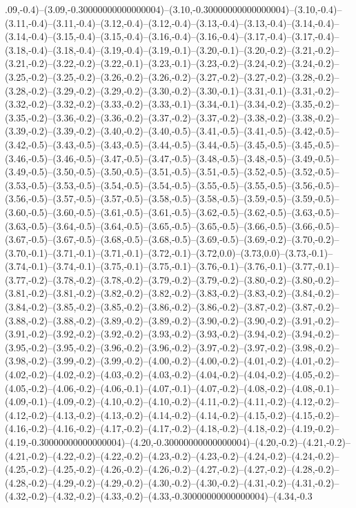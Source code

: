 .09,-0.4)--(3.09,-0.30000000000000004)--(3.10,-0.30000000000000004)--(3.10,-0.4)--(3.11,-0.4)--(3.11,-0.4)--(3.12,-0.4)--(3.12,-0.4)--(3.13,-0.4)--(3.13,-0.4)--(3.14,-0.4)--(3.14,-0.4)--(3.15,-0.4)--(3.15,-0.4)--(3.16,-0.4)--(3.16,-0.4)--(3.17,-0.4)--(3.17,-0.4)--(3.18,-0.4)--(3.18,-0.4)--(3.19,-0.4)--(3.19,-0.1)--(3.20,-0.1)--(3.20,-0.2)--(3.21,-0.2)--(3.21,-0.2)--(3.22,-0.2)--(3.22,-0.1)--(3.23,-0.1)--(3.23,-0.2)--(3.24,-0.2)--(3.24,-0.2)--(3.25,-0.2)--(3.25,-0.2)--(3.26,-0.2)--(3.26,-0.2)--(3.27,-0.2)--(3.27,-0.2)--(3.28,-0.2)--(3.28,-0.2)--(3.29,-0.2)--(3.29,-0.2)--(3.30,-0.2)--(3.30,-0.1)--(3.31,-0.1)--(3.31,-0.2)--(3.32,-0.2)--(3.32,-0.2)--(3.33,-0.2)--(3.33,-0.1)--(3.34,-0.1)--(3.34,-0.2)--(3.35,-0.2)--(3.35,-0.2)--(3.36,-0.2)--(3.36,-0.2)--(3.37,-0.2)--(3.37,-0.2)--(3.38,-0.2)--(3.38,-0.2)--(3.39,-0.2)--(3.39,-0.2)--(3.40,-0.2)--(3.40,-0.5)--(3.41,-0.5)--(3.41,-0.5)--(3.42,-0.5)--(3.42,-0.5)--(3.43,-0.5)--(3.43,-0.5)--(3.44,-0.5)--(3.44,-0.5)--(3.45,-0.5)--(3.45,-0.5)--(3.46,-0.5)--(3.46,-0.5)--(3.47,-0.5)--(3.47,-0.5)--(3.48,-0.5)--(3.48,-0.5)--(3.49,-0.5)--(3.49,-0.5)--(3.50,-0.5)--(3.50,-0.5)--(3.51,-0.5)--(3.51,-0.5)--(3.52,-0.5)--(3.52,-0.5)--(3.53,-0.5)--(3.53,-0.5)--(3.54,-0.5)--(3.54,-0.5)--(3.55,-0.5)--(3.55,-0.5)--(3.56,-0.5)--(3.56,-0.5)--(3.57,-0.5)--(3.57,-0.5)--(3.58,-0.5)--(3.58,-0.5)--(3.59,-0.5)--(3.59,-0.5)--(3.60,-0.5)--(3.60,-0.5)--(3.61,-0.5)--(3.61,-0.5)--(3.62,-0.5)--(3.62,-0.5)--(3.63,-0.5)--(3.63,-0.5)--(3.64,-0.5)--(3.64,-0.5)--(3.65,-0.5)--(3.65,-0.5)--(3.66,-0.5)--(3.66,-0.5)--(3.67,-0.5)--(3.67,-0.5)--(3.68,-0.5)--(3.68,-0.5)--(3.69,-0.5)--(3.69,-0.2)--(3.70,-0.2)--(3.70,-0.1)--(3.71,-0.1)--(3.71,-0.1)--(3.72,-0.1)--(3.72,0.0)--(3.73,0.0)--(3.73,-0.1)--(3.74,-0.1)--(3.74,-0.1)--(3.75,-0.1)--(3.75,-0.1)--(3.76,-0.1)--(3.76,-0.1)--(3.77,-0.1)--(3.77,-0.2)--(3.78,-0.2)--(3.78,-0.2)--(3.79,-0.2)--(3.79,-0.2)--(3.80,-0.2)--(3.80,-0.2)--(3.81,-0.2)--(3.81,-0.2)--(3.82,-0.2)--(3.82,-0.2)--(3.83,-0.2)--(3.83,-0.2)--(3.84,-0.2)--(3.84,-0.2)--(3.85,-0.2)--(3.85,-0.2)--(3.86,-0.2)--(3.86,-0.2)--(3.87,-0.2)--(3.87,-0.2)--(3.88,-0.2)--(3.88,-0.2)--(3.89,-0.2)--(3.89,-0.2)--(3.90,-0.2)--(3.90,-0.2)--(3.91,-0.2)--(3.91,-0.2)--(3.92,-0.2)--(3.92,-0.2)--(3.93,-0.2)--(3.93,-0.2)--(3.94,-0.2)--(3.94,-0.2)--(3.95,-0.2)--(3.95,-0.2)--(3.96,-0.2)--(3.96,-0.2)--(3.97,-0.2)--(3.97,-0.2)--(3.98,-0.2)--(3.98,-0.2)--(3.99,-0.2)--(3.99,-0.2)--(4.00,-0.2)--(4.00,-0.2)--(4.01,-0.2)--(4.01,-0.2)--(4.02,-0.2)--(4.02,-0.2)--(4.03,-0.2)--(4.03,-0.2)--(4.04,-0.2)--(4.04,-0.2)--(4.05,-0.2)--(4.05,-0.2)--(4.06,-0.2)--(4.06,-0.1)--(4.07,-0.1)--(4.07,-0.2)--(4.08,-0.2)--(4.08,-0.1)--(4.09,-0.1)--(4.09,-0.2)--(4.10,-0.2)--(4.10,-0.2)--(4.11,-0.2)--(4.11,-0.2)--(4.12,-0.2)--(4.12,-0.2)--(4.13,-0.2)--(4.13,-0.2)--(4.14,-0.2)--(4.14,-0.2)--(4.15,-0.2)--(4.15,-0.2)--(4.16,-0.2)--(4.16,-0.2)--(4.17,-0.2)--(4.17,-0.2)--(4.18,-0.2)--(4.18,-0.2)--(4.19,-0.2)--(4.19,-0.30000000000000004)--(4.20,-0.30000000000000004)--(4.20,-0.2)--(4.21,-0.2)--(4.21,-0.2)--(4.22,-0.2)--(4.22,-0.2)--(4.23,-0.2)--(4.23,-0.2)--(4.24,-0.2)--(4.24,-0.2)--(4.25,-0.2)--(4.25,-0.2)--(4.26,-0.2)--(4.26,-0.2)--(4.27,-0.2)--(4.27,-0.2)--(4.28,-0.2)--(4.28,-0.2)--(4.29,-0.2)--(4.29,-0.2)--(4.30,-0.2)--(4.30,-0.2)--(4.31,-0.2)--(4.31,-0.2)--(4.32,-0.2)--(4.32,-0.2)--(4.33,-0.2)--(4.33,-0.30000000000000004)--(4.34,-0.3